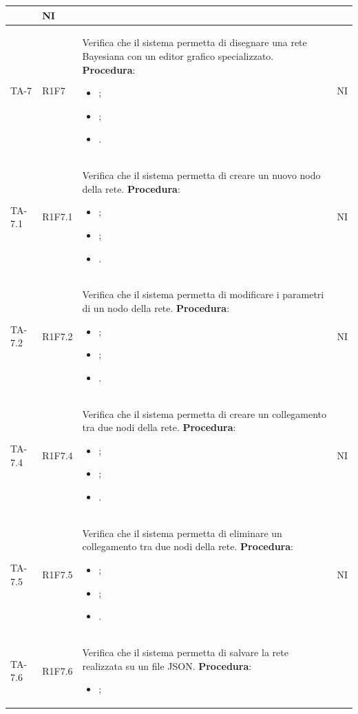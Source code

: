 \begin{longtable}{|C{2.5cm}|C{2.5cm}|L{6.5cm}|C{1.5cm}|}
\begin{itemize}
	\end{itemize}
	 & {NI}\\
	\hline
	{TA-7} & {R1F7} & 
	Verifica che il sistema permetta di disegnare una rete Bayesiana con un editor grafico specializzato.
	\textbf{Procedura}:
	\begin{itemize}		
		\item ;
		\item ;
		\item .
	\end{itemize}
	 & {NI}\\
	\hline
	{TA-7.1} & {R1F7.1} & 
	Verifica che il sistema permetta di creare un nuovo nodo della rete.
	\textbf{Procedura}:
	\begin{itemize}		
		\item ;
		\item ;
		\item .
	\end{itemize}
	 & {NI}\\
	\hline
	{TA-7.2} & {R1F7.2} & 
	Verifica che il sistema permetta di modificare i parametri di un nodo della rete.
	\textbf{Procedura}:
	\begin{itemize}		
		\item ;
		\item ;
		\item .
	\end{itemize}
	 & {NI}\\
	\hline
	{TA-7.4} & {R1F7.4} & 
	Verifica che il sistema permetta di creare un collegamento tra due nodi della rete.
	\textbf{Procedura}:
	\begin{itemize}		
		\item ;
		\item ;
		\item .
	\end{itemize}
	 & {NI}\\
	\hline
	{TA-7.5} & {R1F7.5} & 
	Verifica che il sistema permetta di eliminare un collegamento tra due nodi della rete.
	\textbf{Procedura}:
	\begin{itemize}		
		\item ;
		\item ;
		\item .
	\end{itemize}
	 & {NI}\\
	\hline
	{TA-7.6} & {R1F7.6} & 
	Verifica che il sistema permetta di salvare la rete realizzata su un file JSON.
	\textbf{Procedura}:
	\begin{itemize}		
		\item ;

\end{itemize}
\end{longtable}
